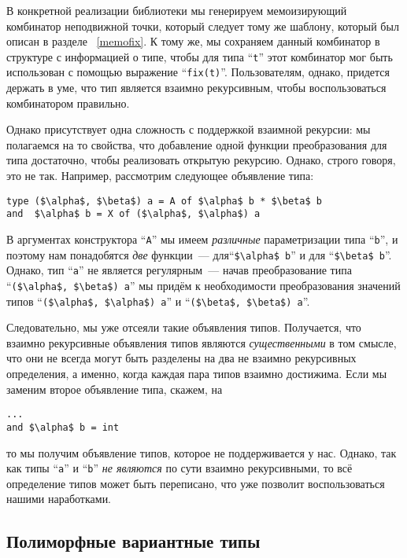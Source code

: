 В конкретной реализации библиотеки мы генерируем мемоизирующий комбинатор неподвижной точки, который следует тому же шаблону, который был описан в разделе ~\ref{memofix}. К тому же, мы сохраняем данный комбинатор в структуре с информацией о типе, чтобы для 
типа ``\lstinline{t}'' этот комбинатор мог быть использован с помощью выражение 
``\lstinline{fix(t)}''. Пользователям, однако, придется держать в уме, что тип является взаимно рекурсивным, чтобы воспользоваться комбинатором правильно.

Однако присутствует одна сложность с поддержкой взаимной рекурсии: мы полагаемся на то свойства, что добавление одной функции преобразования для типа  достаточно, чтобы реализовать открытую рекурсию. Однако, строго говоря, это не так. Например, рассмотрим следующее объявление типа:

\begin{lstlisting}
type ($\alpha$, $\beta$) a = A of $\alpha$ b * $\beta$ b
and  $\alpha$ b = X of ($\alpha$, $\alpha$) a
\end{lstlisting}

В аргументах конструктора ``\lstinline{A}'' мы имеем \emph{различные} параметризации типа ``\lstinline{b}'', и поэтому нам понадобятся \emph{две} функции~--- для``\lstinline{$\alpha$ b}'' и для ``\lstinline{$\beta$ b}''. Однако, тип ``\lstinline{a}'' не является регулярным~--- начав преобразование типа ``\lstinline{($\alpha$, $\beta$) a}'' мы придём к необходимости преобразования значений типов ``\lstinline{($\alpha$, $\alpha$) a}'' и ``\lstinline{($\beta$, $\beta$) a}''.

Следовательно, мы уже отсеяли такие объявления типов. Получается, что взаимно рекурсивные объявления типов являются \emph{существенными} в том смысле, что они не всегда могут быть разделены на два не взаимно рекурсивных определения, а именно, когда каждая пара типов взаимно достижима. Если мы заменим второе объявление типа, скажем, на

\begin{lstlisting}
...
and $\alpha$ b = int
\end{lstlisting}

то мы получим объявление типов, которое не поддерживается у нас. Однако, так как типы ``\lstinline{a}'' и ``\lstinline{b}''  \emph{не являются}
по сути взаимно рекурсивными, то всё определение типов может быть переписано, что уже позволит воспользоваться нашими наработками.


\subsection{Полиморфные вариантные типы}
\label{pv}

